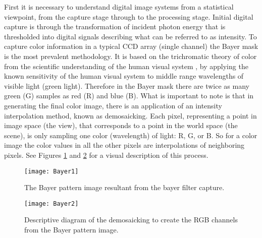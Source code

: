 %
%
%
%
%
%

%
%
%



First it is necessary to understand digital image systems from a statistical viewpoint, from the capture stage through to the processing stage. Initial digital capture is through the transformation of incident photon energy that is thresholded into digital signals describing what can be referred to as intensity. To capture color information in a typical CCD array (single channel) the Bayer mask is the most prevalent methodology. It is based on the trichromatic theory of color from the scientific understanding of the human visual system \cite{Palmer1999}, by applying the known sensitivity of the human visual system to middle range wavelengths of visible light (green light). Therefore in the Bayer mask there are twice as many green (G) samples as red (R) and blue (B). What is important to note is that in generating the final color image, there is an application of an intensity interpolation method, known as demosaicking. Each pixel, representing a point in image space (the view), that corresponds to a point in the world space (the scene), is only sampling one color (wavelength) of light: R, G, or B. So for a color image the color values in all the other pixels are interpolations of neighboring pixels. See Figures \ref{Bayer1} and \ref{Bayer2} for a visual description of this process.
 
\begin{figure}[!h]
\centering
\texttt{[image: Bayer1]}
\caption{The Bayer pattern image resultant from the bayer filter capture.}
\label{Bayer1}
\end{figure}
 
\begin{figure}[!h]
\centering
\texttt{[image: Bayer2]}
\caption{Descriptive diagram of the demosaicking to create the RGB channels from the Bayer pattern image.}
\label{Bayer2}
\end{figure}

